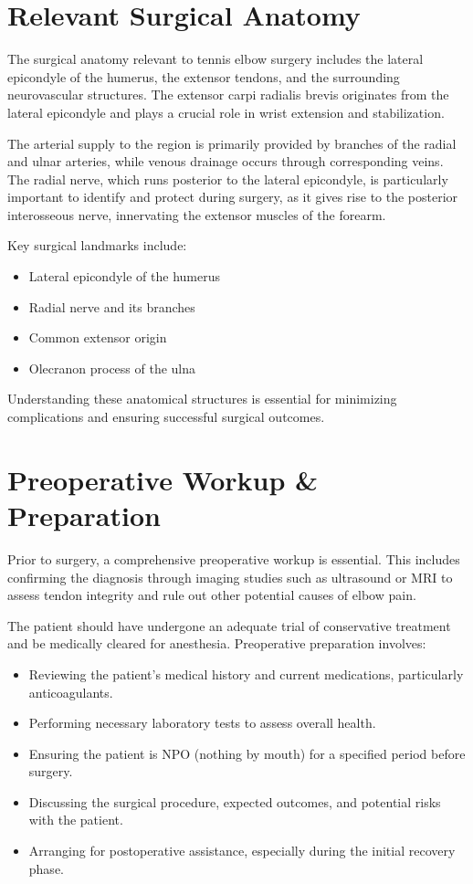 \section*{Relevant Surgical Anatomy}
The surgical anatomy relevant to tennis elbow surgery includes the lateral epicondyle of the humerus, the extensor tendons, and the surrounding neurovascular structures. The extensor carpi radialis brevis originates from the lateral epicondyle and plays a crucial role in wrist extension and stabilization. 

The arterial supply to the region is primarily provided by branches of the radial and ulnar arteries, while venous drainage occurs through corresponding veins. The radial nerve, which runs posterior to the lateral epicondyle, is particularly important to identify and protect during surgery, as it gives rise to the posterior interosseous nerve, innervating the extensor muscles of the forearm. 

Key surgical landmarks include:

\begin{itemize}
  \item Lateral epicondyle of the humerus
  \item Radial nerve and its branches
  \item Common extensor origin
  \item Olecranon process of the ulna
\end{itemize}

Understanding these anatomical structures is essential for minimizing complications and ensuring successful surgical outcomes.

\section*{Preoperative Workup \& Preparation}
Prior to surgery, a comprehensive preoperative workup is essential. This includes confirming the diagnosis through imaging studies such as ultrasound or MRI to assess tendon integrity and rule out other potential causes of elbow pain. 

The patient should have undergone an adequate trial of conservative treatment and be medically cleared for anesthesia. Preoperative preparation involves:

\begin{itemize}
  \item Reviewing the patient's medical history and current medications, particularly anticoagulants.
  \item Performing necessary laboratory tests to assess overall health.
  \item Ensuring the patient is NPO (nothing by mouth) for a specified period before surgery.
  \item Discussing the surgical procedure, expected outcomes, and potential risks with the patient.
  \item Arranging for postoperative assistance, especially during the initial recovery phase.
\end{itemize}

